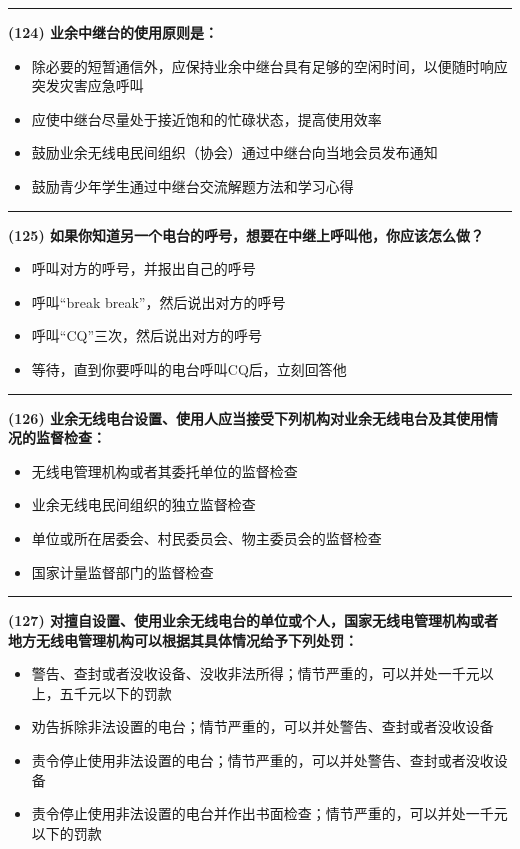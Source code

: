 \documentclass[twocolumn]{ctexart}  %
\begin{document}
\noindent\rule{0.5\textwidth}{1pt}
\heiti \textbf{(124) 业余中继台的使用原则是：} \songti {\color{gray} [LK0275] }
\begin{itemize}
	\item  除必要的短暂通信外，应保持业余中继台具有足够的空闲时间，以便随时响应突发灾害应急呼叫
	\item  应使中继台尽量处于接近饱和的忙碌状态，提高使用效率
	\item  鼓励业余无线电民间组织（协会）通过中继台向当地会员发布通知
	\item  鼓励青少年学生通过中继台交流解题方法和学习心得
\end{itemize}


\noindent\rule{0.5\textwidth}{1pt}
\heiti \textbf{(125) 如果你知道另一个电台的呼号，想要在中继上呼叫他，你应该怎么做？} \songti {\color{gray} [LK1096] }
\begin{itemize}
	\item  呼叫对方的呼号，并报出自己的呼号
	\item  呼叫“break break”，然后说出对方的呼号
	\item  呼叫“CQ”三次，然后说出对方的呼号
	\item  等待，直到你要呼叫的电台呼叫CQ后，立刻回答他
\end{itemize}


\noindent\rule{0.5\textwidth}{1pt}
\heiti \textbf{(126) 业余无线电台设置、使用人应当接受下列机构对业余无线电台及其使用情况的监督检查：} \songti {\color{gray} [LK0074] }
\begin{itemize}
	\item  无线电管理机构或者其委托单位的监督检查
	\item  业余无线电民间组织的独立监督检查
	\item  单位或所在居委会、村民委员会、物主委员会的监督检查
	\item  国家计量监督部门的监督检查
\end{itemize}


\noindent\rule{0.5\textwidth}{1pt}
\heiti \textbf{(127) 对擅自设置、使用业余无线电台的单位或个人，国家无线电管理机构或者地方无线电管理机构可以根据其具体情况给予下列处罚：} \songti {\color{gray} [LK0094] }
\begin{itemize}
	\item  警告、查封或者没收设备、没收非法所得；情节严重的，可以并处一千元以上，五千元以下的罚款
	\item  劝告拆除非法设置的电台；情节严重的，可以并处警告、查封或者没收设备
	\item  责令停止使用非法设置的电台；情节严重的，可以并处警告、查封或者没收设备
	\item  责令停止使用非法设置的电台并作出书面检查；情节严重的，可以并处一千元以下的罚款
\end{itemize}
\end{document}
